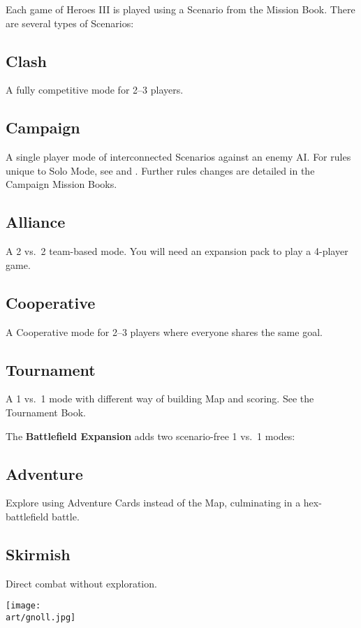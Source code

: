
\begin{multicols*}{2}

Each game of Heroes III is played using a Scenario from the Mission Book.
There are several types of Scenarios:

\subsection*{Clash}
A fully competitive mode for 2--3 players.

\subsection*{Campaign}
A single player mode of interconnected Scenarios against an enemy AI.
For rules unique to Solo Mode, see  and .
Further rules changes are detailed in the Campaign Mission Books.

\subsection*{Alliance}
A 2 vs.~2 team-based mode.
You will need an expansion pack to play a 4-player game.

\subsection*{Cooperative}
A Cooperative mode for 2--3 players where everyone shares the same goal.

\subsection*{Tournament}
A 1 vs.~1 mode with different way of building Map and scoring. See the Tournament Book.

\vspace*{\fill}
\begin{center}
\end{center}

\columnbreak

The \textbf{Battlefield Expansion} adds two scenario-free 1 vs.~1 modes:

\subsection*{Adventure}
Explore using Adventure Cards instead of the Map, culminating in a hex-battlefield battle.

\subsection*{Skirmish}
Direct combat without exploration.

\vspace*{\fill}
\texttt{[image: \\art/gnoll.jpg]}

\end{multicols*}

